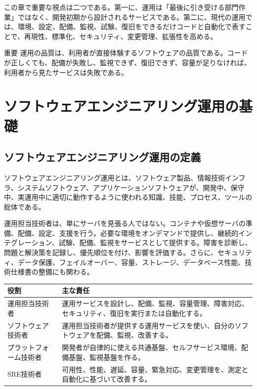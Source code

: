 \documentclass[uplatex,dvipdfmx,a4paper,10pt]{jsarticle}
\begin{document}
この章で重要な視点は二つである。第一に、運用は「最後に引き受ける部門作業」ではなく、開発初期から設計されるサービスである。第二に、現代の運用では、環境、設定、配備、監視、試験、復旧をできるだけコードと自動化で表すことで、再現性、標準化、セキュリティ、変更管理、拡張性を高める。

\begin{pointbox}{重要}
運用の品質は、利用者が直接体験するソフトウェアの品質である。コードが正しくても、配備が失敗し、監視できず、復旧できず、容量が足りなければ、利用者から見たサービスは失敗である。
\end{pointbox}

\section{ソフトウェアエンジニアリング運用の基礎}

\subsection{ソフトウェアエンジニアリング運用の定義}

ソフトウェアエンジニアリング運用とは、ソフトウェア製品、情報技術インフラ、システムソフトウェア、アプリケーションソフトウェアが、開発中、保守中、実運用中に適切に動作するように使われる知識、技能、プロセス、ツールの総体である。

運用担当技術者は、単にサーバを見張る人ではない。コンテナや仮想サーバの準備、配備、設定、支援を行う。必要な環境をオンデマンドで提供し、継続的インテグレーション、試験、配備、監視をサービスとして提供する。障害を診断し、問題と解決策を記録し、優先順位を付け、影響を評価する。さらに、セキュリティ、データ保護、フェイルオーバー、容量、ストレージ、データベース性能、技術仕様書の整備にも関わる。

\begin{longtable}{L{45mm}L{105mm}}
\toprule
役割 & 主な責任 \\
\midrule
運用担当技術者 & 運用サービスを設計し、配備、監視、容量管理、障害対応、セキュリティ、復旧を実行または自動化する。 \\
ソフトウェア技術者 & 運用担当技術者が提供する運用サービスを使い、自分のソフトウェアを配備、監視、改善する。 \\
プラットフォーム技術者 & 開発者が自律的に使える共通基盤、セルフサービス環境、配備基盤、監視基盤を作る。 \\
SRE技術者 & 可用性、性能、遅延、容量、緊急対応、変更管理を、測定と自動化に基づいて改善する。 \\
\bottomrule
\end{longtable}
\end{document}
